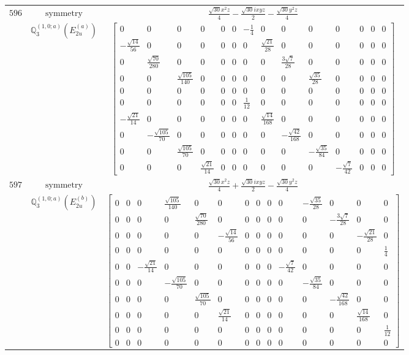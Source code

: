 \documentclass[fleqn,8pt,landscape]{jsarticle}
\begin{document}
\begin{longtable}{ccc}
$ 596 $ & $ \text{symmetry} $ & $ \frac{\sqrt{30} x^{2} z}{4} - \frac{\sqrt{30} i x y z}{2} - \frac{\sqrt{30} y^{2} z}{4} $ \\
$  $ & $ \mathbb{Q}_{3}^{(1,0;a)}(E_{2u}^{(a)}) $ & $ \begin{bmatrix} 0 & 0 & 0 & 0 & 0 & 0 & - \frac{1}{4} & 0 & 0 & 0 & 0 & 0 & 0 & 0 \\ - \frac{\sqrt{14}}{56} & 0 & 0 & 0 & 0 & 0 & 0 & \frac{\sqrt{21}}{28} & 0 & 0 & 0 & 0 & 0 & 0 \\ 0 & \frac{\sqrt{70}}{280} & 0 & 0 & 0 & 0 & 0 & 0 & \frac{3 \sqrt{7}}{28} & 0 & 0 & 0 & 0 & 0 \\ 0 & 0 & \frac{\sqrt{105}}{140} & 0 & 0 & 0 & 0 & 0 & 0 & \frac{\sqrt{35}}{28} & 0 & 0 & 0 & 0 \\ 0 & 0 & 0 & 0 & 0 & 0 & 0 & 0 & 0 & 0 & 0 & 0 & 0 & 0 \\ 0 & 0 & 0 & 0 & 0 & 0 & \frac{1}{12} & 0 & 0 & 0 & 0 & 0 & 0 & 0 \\ - \frac{\sqrt{21}}{14} & 0 & 0 & 0 & 0 & 0 & 0 & \frac{\sqrt{14}}{168} & 0 & 0 & 0 & 0 & 0 & 0 \\ 0 & - \frac{\sqrt{105}}{70} & 0 & 0 & 0 & 0 & 0 & 0 & - \frac{\sqrt{42}}{168} & 0 & 0 & 0 & 0 & 0 \\ 0 & 0 & \frac{\sqrt{105}}{70} & 0 & 0 & 0 & 0 & 0 & 0 & - \frac{\sqrt{35}}{84} & 0 & 0 & 0 & 0 \\ 0 & 0 & 0 & \frac{\sqrt{21}}{14} & 0 & 0 & 0 & 0 & 0 & 0 & - \frac{\sqrt{7}}{42} & 0 & 0 & 0 \end{bmatrix} $ \\ \hline
$ 597 $ & $ \text{symmetry} $ & $ \frac{\sqrt{30} x^{2} z}{4} + \frac{\sqrt{30} i x y z}{2} - \frac{\sqrt{30} y^{2} z}{4} $ \\
$  $ & $ \mathbb{Q}_{3}^{(1,0;a)}(E_{2u}^{(b)}) $ & $ \begin{bmatrix} 0 & 0 & 0 & \frac{\sqrt{105}}{140} & 0 & 0 & 0 & 0 & 0 & 0 & - \frac{\sqrt{35}}{28} & 0 & 0 & 0 \\ 0 & 0 & 0 & 0 & \frac{\sqrt{70}}{280} & 0 & 0 & 0 & 0 & 0 & 0 & - \frac{3 \sqrt{7}}{28} & 0 & 0 \\ 0 & 0 & 0 & 0 & 0 & - \frac{\sqrt{14}}{56} & 0 & 0 & 0 & 0 & 0 & 0 & - \frac{\sqrt{21}}{28} & 0 \\ 0 & 0 & 0 & 0 & 0 & 0 & 0 & 0 & 0 & 0 & 0 & 0 & 0 & \frac{1}{4} \\ 0 & 0 & - \frac{\sqrt{21}}{14} & 0 & 0 & 0 & 0 & 0 & 0 & - \frac{\sqrt{7}}{42} & 0 & 0 & 0 & 0 \\ 0 & 0 & 0 & - \frac{\sqrt{105}}{70} & 0 & 0 & 0 & 0 & 0 & 0 & - \frac{\sqrt{35}}{84} & 0 & 0 & 0 \\ 0 & 0 & 0 & 0 & \frac{\sqrt{105}}{70} & 0 & 0 & 0 & 0 & 0 & 0 & - \frac{\sqrt{42}}{168} & 0 & 0 \\ 0 & 0 & 0 & 0 & 0 & \frac{\sqrt{21}}{14} & 0 & 0 & 0 & 0 & 0 & 0 & \frac{\sqrt{14}}{168} & 0 \\ 0 & 0 & 0 & 0 & 0 & 0 & 0 & 0 & 0 & 0 & 0 & 0 & 0 & \frac{1}{12} \\ 0 & 0 & 0 & 0 & 0 & 0 & 0 & 0 & 0 & 0 & 0 & 0 & 0 & 0 \end{bmatrix} $ \\ \hline

\end{longtable}
\end{document}
